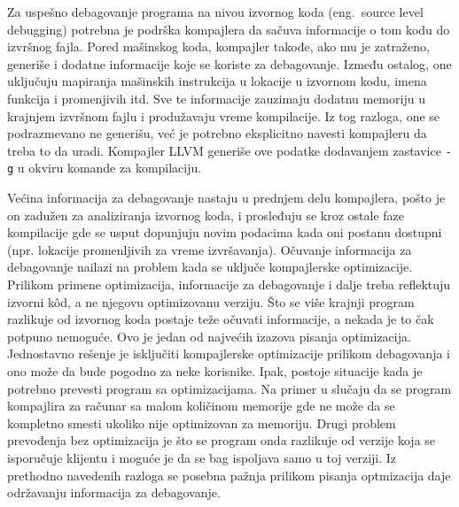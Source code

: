 \documentclass[12pt,oneside]{memoir}
\begin{document}
Za uspešno debagovanje programa na nivou izvornog koda (eng.~{source level debugging}) potrebna je podrška kompajlera da sačuva informacije o tom kodu do izvršnog fajla.
Pored mašinskog koda, kompajler takođe, ako mu je zatraženo, generiše i dodatne informacije koje se koriste za debagovanje.
Između ostalog, one uključuju mapiranja mašinskih instrukcija u lokacije u izvornom kodu, imena funkcija i promenjivih itd.
Sve te informacije zauzimaju dodatnu memoriju u krajnjem izvršnom fajlu i produžavaju vreme kompilacije.
Iz tog razloga, one se podrazmevano ne generišu, već je potrebno eksplicitno navesti kompajleru da treba to da uradi.
Kompajler LLVM generiše ove podatke dodavanjem zastavice \verb|-g| u okviru komande za kompilaciju.

Većina informacija za debagovanje nastaju u prednjem delu kompajlera, pošto je on zadužen za analiziranja izvornog koda, i prosleđuju se kroz ostale faze kompilacije gde se usput dopunjuju novim podacima kada oni postanu dostupni (npr. lokacije promenljivih za vreme izvršavanja). %
Očuvanje informacija za debagovanje nailazi na problem kada se uključe kompajlerske optimizacije.
Prilikom primene optimizacija, informacije za debagovanje i dalje treba reflektuju izvorni k\^od, a ne njegovu optimizovanu verziju.
Što se više krajnji program razlikuje od izvornog koda postaje teže očuvati informacije, a nekada je to čak potpuno nemoguće.
Ovo je jedan od najvećih izazova pisanja optimizacija.
Jednostavno rešenje je isključiti kompajlerske optimizacije prilikom debagovanja i ono može da bude pogodno za neke korisnike.
Ipak, postoje situacije kada je potrebno prevesti program sa optimizacijama.
Na primer u slučaju da se program kompajlira za računar sa malom količinom memorije gde ne može da se kompletno smesti ukoliko nije optimizovan za memoriju.
Drugi problem prevođenja bez optimizacija je što se program onda razlikuje od verzije koja se isporučuje klijentu i moguće je da se bag ispoljava samo u toj verziji.
Iz prethodno navedenih razloga se posebna pažnja prilikom pisanja optmizacija daje održavanju informacija za debagovanje.
\end{document}
